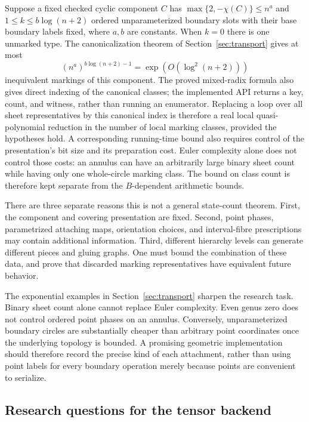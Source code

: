 \documentclass[11pt]{article}
\theoremstyle{definition}
\theoremstyle{remark}
\begin{document}
Suppose a fixed checked cyclic component $C$ has
$\max\{2,-\chi(C)\}\le n^a$ and $1\le k\le b\log(n+2)$ ordered
unparameterized boundary slots with their base boundary labels fixed,
where $a,b$ are constants. When $k=0$ there is one unmarked type. The
canonicalization theorem of Section~\ref{sec:transport} gives at most
\[
 (n^a)^{b\log(n+2)-1}=\exp(O(\log^2(n+2)))
\]
inequivalent markings of this component. The proved mixed-radix formula
also gives direct indexing of the canonical classes; the implemented
API returns a key, count, and witness, rather than running an enumerator.
Replacing a loop over all sheet
representatives by this canonical index is therefore a real local
quasi-polynomial reduction in the number of local marking classes,
provided the hypotheses hold. A corresponding running-time bound also
requires control of the presentation's bit size and its preparation
cost. Euler complexity alone does not control those costs: an annulus
can have an arbitrarily large binary sheet count while having only one
whole-circle marking class. The bound on class count is therefore kept
separate from the $B$-dependent arithmetic bounds.

There are three separate reasons this is not a general state-count
theorem. First, the component and covering presentation are fixed.
Second, point phases, parametrized attaching maps, orientation choices,
and interval-fibre prescriptions may contain additional information.
Third, different hierarchy levels can generate different pieces and
gluing graphs. One must bound the combination of these data, and prove
that discarded marking representatives have equivalent future behavior.

The exponential examples in Section~\ref{sec:transport} sharpen the
research task. Binary sheet count alone cannot replace Euler complexity.
Even genus zero does not control ordered point phases on an annulus.
Conversely, unparameterized boundary circles are substantially cheaper
than arbitrary point coordinates once the underlying topology is bounded.
A promising geometric implementation should therefore record the precise
kind of each attachment, rather than using point labels for every
boundary operation merely because points are convenient to serialize.

\subsection{Research questions for the tensor backend}
\end{document}
